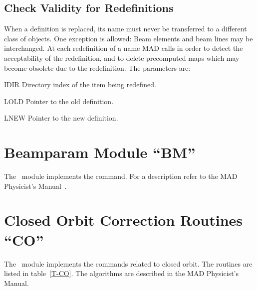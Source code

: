 \section{Check Validity for Redefinitions}                 
\label{AASMOD}
When a definition is replaced,
its name must never be transferred to a different class of objects.
One exception is allowed: Beam elements and beam lines may be
interchanged. 
At each redefinition of a name MAD calls  in order to
detect the acceptability of the redefinition,
and to delete precomputed maps which may become obsolete due to the
redefinition.
The parameters are:
\begin{mylist}
\item[IDIR]
Directory index of the item being redefined.
\item[LOLD]
Pointer to the old definition.
\item[LNEW]
Pointer to the new definition.
\end{mylist}


\chapter{Beamparam Module ``BM''}
\label{BM}
The ~module implements the  command.
For a description refer to the MAD Physicist's Manual~\cite{PHYS}.


\chapter{Closed Orbit Correction Routines ``CO''}
\label{CO}
The ~module implements the commands related to closed orbit.
The routines are listed in table~\ref{T-CO}.
The algorithms are described in the MAD Physicist's Manual.


